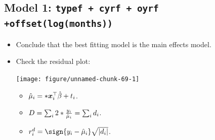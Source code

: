 \documentclass{article}\usepackage[]{graphicx}\usepackage[svgnames]{xcolor}
\newenvironment{knitrout}{}{} %
\let\exp\relax%
\let\log\relax%
\DeclarePairedDelimiter\abs{\lvert}{\rvert}
\providecommand{\Vector}[1]{\bm{#1}}%
\begin{document}
\subsection*{Model 1: \texttt{typef + cyrf + oyrf +offset(log(months))}}
\begin{itemize}
      \item Conclude that the best fitting model is the main effects model.
      \item Check the residual plot:
\begin{knitrout}
\color{fgcolor}

{\centering \texttt{[image: figure/unnamed-chunk-69-1]} 

}


\end{knitrout}
            \begin{itemize}
                  \item $ \hat{\mu}_i=\exp*{\Vector{x}_i^\top \hat{\beta}+\log{t_i}} $.
                  \item $ D=\sum_{i}2\log*{\frac{y_i}{\hat{\mu}_i}}=\sum_i d_i $.
                  \item $ r_i^d=\sign{y_i-\hat{\mu}_i}\sqrt{\abs{d_i}} $.
            \end{itemize}
\end{itemize}
\end{document}
